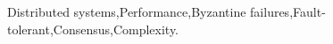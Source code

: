\begin{abstract}
\end{abstract}


\begin{keyword}
Distributed systems\sep Performance\sep Byzantine
failures\sep Fault-tolerant\sep Consensus\sep Complexity.
\end{keyword}

\maketitle
